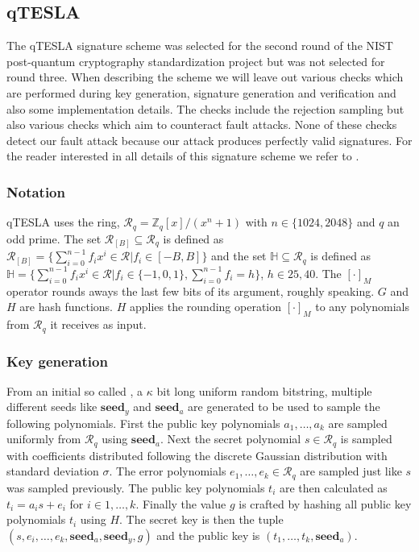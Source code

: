 \subsection{qTESLA}
The qTESLA signature scheme \cite{qtesla} was selected for the second round of the NIST post-quantum cryptography standardization project but was not selected for round three.
When describing the scheme we will leave out various checks which are performed during key generation, signature generation and verification and also some implementation details. The checks include the rejection sampling
but also various checks which aim to counteract fault attacks. None of these checks detect our fault attack because our attack produces perfectly valid signatures. For the reader interested in all details of this signature scheme we refer to \cite{qtesla}.

\subsubsection{Notation}
qTESLA uses the ring, $\mathcal{R}_{q} = \mathds{Z}_{q}[x] / (x^{n} + 1)$ with $n \in \{1024, 2048\}$ and $q$ an odd prime. The set $\mathcal{R}_{[B]} \subseteq \mathcal{R}_q$ is defined as $\mathcal{R}_{[B]} = \{\sum_{i=0}^{n-1}f_{i}x^{i} \in \mathcal{R} \vert f_{i} \in [-B, B]\}$ and the set $\mathds{H} \subseteq \mathcal{R}_q$ is defined as $\mathds{H} = \{\sum_{i=0}^{n-1}f_{i}x^{i} \in \mathcal{R} \vert f_{i} \in \{-1, 0, 1\}, \sum_{i=0}^{n-1}f_{i} = h\}$, $h \in {25, 40}$. The $[\cdot]_M$ operator rounds aways the last few bits of its argument, roughly speaking. $G$ and $H$ are hash functions. $H$ applies the rounding operation $[\cdot]_M$ to any polynomials from $\mathcal{R}_q$ it receives as input.

\subsubsection{Key generation}
From an initial so called , a $κ$ bit long uniform random bitstring, multiple different seeds like $\textbf{seed}_{y}$ and  $\textbf{seed}_{a}$ are generated to be used to sample the following polynomials.
First the public key polynomials $a_{1}, \ldots, a_{k}$ are sampled uniformly from $\mathcal{R}_{q}$ using $\textbf{seed}_{a}$.
Next the secret polynomial $s \in \mathcal{R}_q$ is sampled with coefficients distributed following the discrete Gaussian distribution with standard deviation $\sigma$.
The error polynomials $e_{1}, \ldots, e_{k} \in \mathcal{R}_q$ are sampled just like $s$ was sampled previously.
The public key polynomials $t_{i}$ are then calculated as $t_{i} = a_{i} s + e_{i}$ for $i \in {1, \ldots, k}$.
Finally the value $g$ is crafted by hashing all public key polynomials $t_{i}$ using $H$.
The secret key is then the tuple $(s, e_{i}, \ldots, e_{k}, \textbf{seed}_{a},  \textbf{seed}_{y}, g)$ and the public key is $(t_{1}, \ldots, t_{k},  \textbf{seed}_{a})$.

